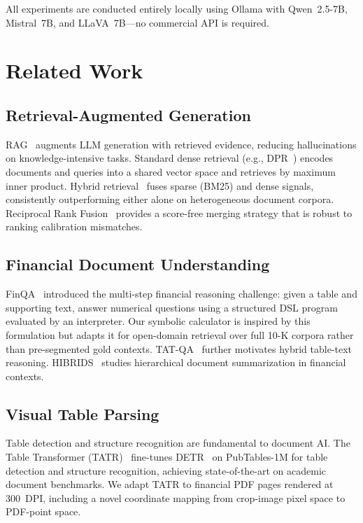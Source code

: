 \documentclass[conference]{IEEEtran}
\begin{document}
All experiments are conducted entirely locally using Ollama with Qwen~2.5-7B,
Mistral~7B, and LLaVA~7B---no commercial API is required.

\section{Related Work}

\subsection{Retrieval-Augmented Generation}
RAG~\cite{lewis2020rag} augments LLM generation with retrieved evidence,
reducing hallucinations on knowledge-intensive tasks. Standard dense retrieval
(e.g., DPR~\cite{karpukhin2020dpr}) encodes documents and queries into a shared
vector space and retrieves by maximum inner product. Hybrid retrieval~\cite{chen2021evaluating}
fuses sparse (BM25) and dense signals, consistently outperforming either alone
on heterogeneous document corpora. Reciprocal Rank Fusion~\cite{cormack2009rrf}
provides a score-free merging strategy that is robust to ranking calibration
mismatches.

\subsection{Financial Document Understanding}
FinQA~\cite{chen2021finqa} introduced the multi-step financial reasoning
challenge: given a table and supporting text, answer numerical questions using a
structured DSL program evaluated by an interpreter. Our symbolic calculator is
inspired by this formulation but adapts it for open-domain retrieval over full
10-K corpora rather than pre-segmented gold contexts. TAT-QA~\cite{zhu2021tatqa}
further motivates hybrid table-text reasoning. HIBRIDS~\cite{zhu2022hibrids}
studies hierarchical document summarization in financial contexts.

\subsection{Visual Table Parsing}
Table detection and structure recognition are fundamental to document AI.
The Table Transformer (TATR)~\cite{smock2022pubtables} fine-tunes DETR~\cite{carion2020detr}
on PubTables-1M for table detection and structure recognition, achieving
state-of-the-art on academic document benchmarks. We adapt TATR to
financial PDF pages rendered at 300~DPI, including a novel coordinate mapping
from crop-image pixel space to PDF-point space.
\end{document}
